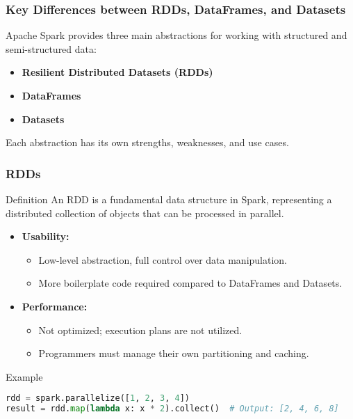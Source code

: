 \documentclass{beamer}
\begin{document}
\begin{frame}
    \frametitle{Key Differences between RDDs, DataFrames, and Datasets}
    Apache Spark provides three main abstractions for working with structured and semi-structured data: 
    \begin{itemize}
        \item \textbf{Resilient Distributed Datasets (RDDs)}
        \item \textbf{DataFrames}
        \item \textbf{Datasets}
    \end{itemize}
    Each abstraction has its own strengths, weaknesses, and use cases.
\end{frame}

\begin{frame}[fragile]
    \frametitle{RDDs}
    \begin{block}{Definition}
        An RDD is a fundamental data structure in Spark, representing a distributed collection of objects that can be processed in parallel.
    \end{block}

    \begin{itemize}
        \item \textbf{Usability:}
        \begin{itemize}
            \item Low-level abstraction, full control over data manipulation.
            \item More boilerplate code required compared to DataFrames and Datasets.
        \end{itemize}
        \item \textbf{Performance:}
        \begin{itemize}
            \item Not optimized; execution plans are not utilized.
            \item Programmers must manage their own partitioning and caching.
        \end{itemize}
    \end{itemize}
    
    \begin{block}{Example}
    \begin{lstlisting}[language=Python]
rdd = spark.parallelize([1, 2, 3, 4])
result = rdd.map(lambda x: x * 2).collect()  # Output: [2, 4, 6, 8]
    \end{lstlisting}
    \end{block}
\end{frame}
\end{document}
